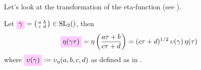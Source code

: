 \documentclass{article}
\begin{document}
\begin{Hemmecke}


Let's look at the transformation of the eta-function (see
\cite[Lemma~2.27]{Radu_PhD_2010}).

Let
$\defineNotation[gamma]{\gamma} =
\left(\begin{smallmatrix}a&b\\c&d\end{smallmatrix}\right) \in
\SL2Z$, then
\begin{gather}
\defineNotation[eta]{\eta(\gamma\tau)} =
\eta\left(\frac{a\tau+b}{c\tau+d}\right) =
(c\tau+d)^{1/2}\,\upsilon(\gamma)\,\eta(\tau)
\label{eq:eta-transformation}
\end{gather}
where
$\defineNotation[upsilon-gamma]{\upsilon(\gamma)} :=
\upsilon_\eta(a,b,c,d)$ as defined as in
\cite[Lemma~2.27]{Radu_PhD_2010}.


\end{Hemmecke}
\end{document}
